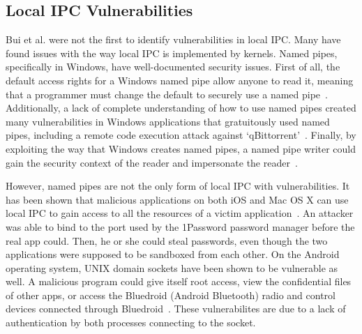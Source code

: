 \subsection{Local IPC Vulnerabilities}
\label{sec:localIPCVulnerabilities}
Bui et al. were not the first to identify vulnerabilities in local IPC.  Many have found issues with the way local IPC is implemented by kernels.  Named pipes, specifically in Windows, have well-documented security issues.  First of all, the default access rights for a Windows named pipe allow anyone to read it, meaning that a programmer must change the default to securely use a named pipe~\cite{microsoft_2018}.  Additionally, a lack of complete understanding of how to use named pipes created many vulnerabilities in Windows applications that gratuitously used named pipes, including a remote code execution attack against `qBittorrent'~\cite{cohen_2019}.  Finally, by exploiting the way that Windows creates named pipes, a named pipe writer could gain the security context of the reader and impersonate the reader~\cite{watts2002discovering}.

However, named pipes are not the only form of local IPC with vulnerabilities.  It has been shown that malicious applications on both iOS and Mac OS X can use local IPC to gain access to all the resources of a victim application~\cite{Xing_2015_CAI_2810103_2813609}.  An attacker was able to bind to the port used by the 1Password password manager before the real app could.  Then, he or she could steal passwords, even though the two applications were supposed to be sandboxed from each other.  On the Android operating system, UNIX domain sockets have been shown to be vulnerable as well.  A malicious program could give itself root access, view the confidential files of other apps, or access the Bluedroid (Android Bluetooth) radio and control devices connected through Bluedroid~\cite{Shao_2016_MAU_2976749_2978297}.  These vulnerabilites are due to a lack of authentication by both processes connecting to the socket.